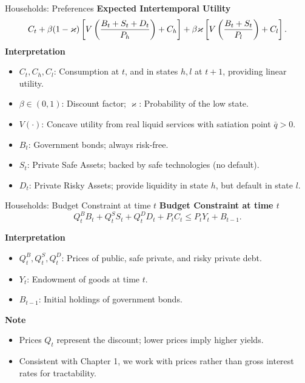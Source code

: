 \documentclass[11pt,aspectratio=169]{beamer}
\begin{document}
\begin{frame}{Households: Preferences}
\small
\textbf{Expected Intertemporal Utility}
\begin{equation}
C_{t}+\beta (1-\varkappa )\left[ V\left( \frac{B_{t}+S_{t}+D_{t}}{P_{h}}%
\right) +C_{h}\right] +\beta \varkappa \left[ V\left( \frac{B_{t}+S_{t}}{%
P_{l}}\right) +C_{l}\right]. \label{UtilitySafe}
\end{equation}
\vspace{0.2cm}
\textbf{Interpretation}
\begin{itemize}
    \item $C_t, C_h, C_l$: Consumption at $t$, and in states $h, l$ at $t+1$, providing linear utility.
    \item $\beta \in (0,1)$: Discount factor; $\varkappa$: Probability of the low state.
    \item $V(\cdot)$: Concave utility from real liquid services with satiation point $\bar{q} > 0$.
    \item $B_t$: Government bonds; always risk-free.
    \item $S_t$: Private Safe Assets; backed by safe technologies (no default).
    \item $D_t$: Private Risky Assets; provide liquidity in state $h$, but default in state $l$.
\end{itemize}
\end{frame}


\begin{frame}{Households: Budget Constraint at time $t$}
\small
\textbf{Budget Constraint at time $t$}
\begin{equation}
Q_{t}^{B}B_{t}+Q_{t}^{S}S_{t}+Q_{t}^{D}D_{t}+P_{t}C_{t}\leq
P_{t}Y_{t}+B_{t-1}. \label{BC0}
\end{equation}

\textbf{Interpretation}
\begin{itemize}
    \item $Q_t^B, Q_t^S, Q_t^D$: Prices of public, safe private, and risky private debt.
    \item $Y_t$: Endowment of goods at time $t$.
    \item $B_{t-1}$: Initial holdings of government bonds.
\end{itemize}

\vspace{0.3cm}
\textbf{Note}
\begin{itemize}

    \item Prices $Q_t$ represent the discount; lower prices imply higher yields.
    \item Consistent with Chapter 1, we work with prices rather than gross interest rates for tractability.
\end{itemize}
\end{frame}
\end{document}
